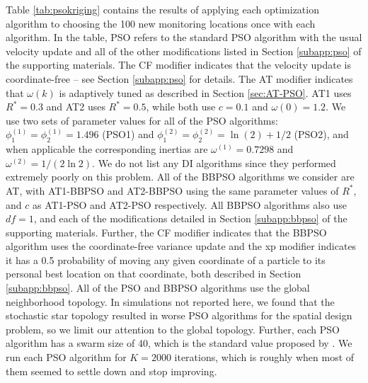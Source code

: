 \documentclass[cmbright]{staauth}
\begin{document}
Table \ref{tab:psokriging} contains the results of applying each optimization algorithm to choosing the 100 new monitoring locations once with each algorithm. In the table, PSO refers to the standard PSO algorithm with the usual velocity update and all of the other modifications listed in Section \ref{subapp:pso} of the supporting materials. The CF modifier indicates that the velocity update is coordinate-free -- see Section \ref{subapp:pso} for details. The AT modifier indicates that $\omega(k)$ is adaptively tuned as described in Section \ref{sec:AT-PSO}. AT1 uses $R^*=0.3$ and AT2 uses $R^*=0.5$, while both use $c=0.1$ and $\omega(0) = 1.2$. We use two sets of parameter values for all of the PSO algorithms: $\phi_1^{(1)}=\phi_2^{(1)}=1.496$ (PSO1) and $\phi_1^{(2)}=\phi_2^{(2)}=\ln(2) + 1/2$ (PSO2), and when applicable the corresponding inertias are $\omega^{(1)}=0.7298$ and $\omega^{(2)}=1/(2\ln 2)$. We do not list any DI algorithms since they performed extremely poorly on this problem. All of the BBPSO algorithms we consider are AT, with AT1-BBPSO and AT2-BBPSO using the same parameter values of $R^*$, and $c$ as AT1-PSO and AT2-PSO respectively. All BBPSO algorithms also use $df=1$, and each of the modifications detailed in Section \ref{subapp:bbpso} of the supporting materials. Further, the CF modifier indicates that the BBPSO algorithm uses the coordinate-free variance update and the xp modifier indicates it has a 0.5 probability of moving any given coordinate of a particle to its personal best location on that coordinate, both described in Section \ref{subapp:bbpso}. All of the PSO and BBPSO algorithms use the global neighborhood topology. In simulations not reported here, we found that the stochastic star topology resulted in worse PSO algorithms for the spatial design problem, so we limit our attention to the global topology. Further, each PSO algorithm has a swarm size of 40, which is the standard value proposed by \cite{clerc2011spso}. We run each PSO algorithm for $K=2000$ iterations, which is roughly when most of them seemed to settle down and stop improving.
\end{document}
